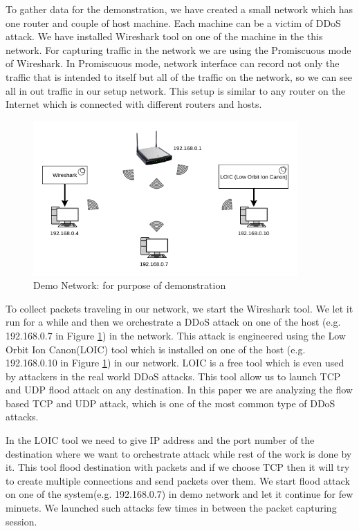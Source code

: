 \documentclass[10pt,oneside,a4paper]{article}
\begin{document}
To gather data for the demonstration, we have created a small network which has one router and couple of host machine. Each machine can be a victim of DDoS attack. We have installed Wireshark tool on one of the machine in the this network. For capturing traffic in the network we are using the Promiscuous mode of Wireshark. In Promiscuous mode, network interface can record not only the traffic that is intended to itself but all of the traffic on the network, so we can see all in out traffic in our setup network. This setup is similar to any router on the Internet which is connected with different routers and hosts.

\begin{figure}[H]
\centering
\includegraphics[width=0.90\textwidth]{demo_network.png}
\caption{Demo Network: for purpose of demonstration} \label{fig:demonetwork}
\end{figure}

To collect packets traveling in our network, we start the Wireshark tool. We let it run for a while and then we orchestrate a DDoS attack on one of the host (e.g. 192.168.0.7 in Figure \ref{fig:demonetwork}) in the network. This attack is engineered using the Low Orbit Ion Canon(LOIC) tool which is installed on one of the host (e.g. 192.168.0.10 in Figure \ref{fig:demonetwork}) in our network. LOIC is a free tool which is even used by attackers in the real world DDoS attacks. This tool allow us to launch TCP and UDP flood attack on any destination. In this paper we are analyzing the flow based TCP and UDP attack, which is one of the most common type of DDoS attacks.

In the LOIC tool we need to give IP address and the port number of the destination where we want to orchestrate attack while rest of the work is done by it. This tool flood destination with packets and if we choose TCP then it will try to create multiple connections and send packets over them. We start flood attack on one of the system(e.g. 192.168.0.7) in demo network and let it continue for few minuets. We launched such attacks few times in between the packet capturing session.
\end{document}
